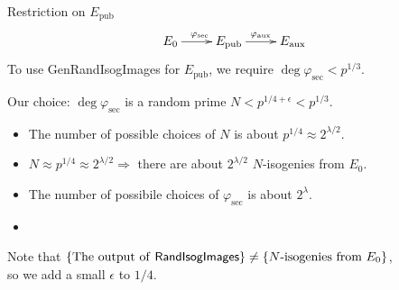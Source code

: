 

\begin{frame}{Restriction on $E_\mathrm{pub}$}
    \vspace{-10pt}
    $$
        \xymatrix{
            E_0 \ar[r]^{\varphi_\mathrm{sec}} & E_\mathrm{pub} \ar[r]^{\varphi_\mathrm{aux}} & E_\mathrm{aux}
        }
    $$
    To use \textsf{GenRandIsogImages} for $E_\mathrm{pub}$,
    we require $\deg\varphi_\mathrm{sec} < p^{1/3}$.
    
    \vspace*{10pt}
    Our choice: $\deg\varphi_\mathrm{sec}$ is a random prime $N < p^{1/4 + \epsilon} < p^{1/3}$.
    \begin{itemize}
        \item The number of possible choices of $N$ is about $p^{1/4} \approx 2^{\lambda/2}$.
        \item $N \approx p^{1/4} \approx 2^{\lambda/2} \Rightarrow$ there are about $2^{\lambda/2}$ $N$-isogenies from $E_0$.
        \item The number of possibile choices of $\varphi_\mathrm{sec}$ is about $2^{\lambda}$.
        \item {}
    \end{itemize}

    \vspace*{10pt}
    Note that
    $\{\text{The output of \textsf{RandIsogImages}}\} \neq \{N\text{-isogenies from }E_0\}$,\\
    so we add a small $\epsilon$ to $1/4$.
\end{frame}

